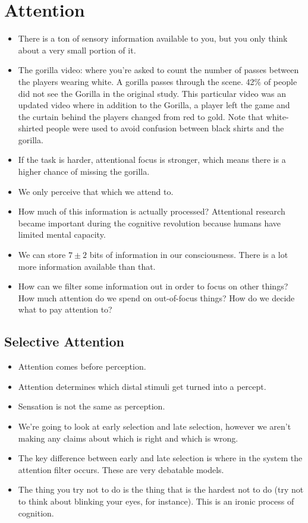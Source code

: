\documentclass[]{article}
\newcommand{\lecture}[1]{\marginpar{{\footnotesize $\leftarrow$ \underline{#1}}}}
\begin{document}
	\section{Attention} \lecture{January 29, 2013}
		\begin{itemize}
			\item There is a ton of sensory information available to you, but you only think about a very small portion of it.
			\item The gorilla video: where you're asked to count the number of passes between the players wearing white. A gorilla passes through the scene. 42\% of people did not see the Gorilla in the original study. This particular video was an updated video where in addition to the Gorilla, a player left the game and the curtain behind the players changed from red to gold. Note that white-shirted people were used to avoid confusion between black shirts and the gorilla.
			\item If the task is harder, attentional focus is stronger, which means there is a higher chance of missing the gorilla.
			\item We only perceive that which we attend to.
			\item How much of this information is actually processed? Attentional research became important during the cognitive revolution because humans have limited mental capacity.
			\item We can store $7 \pm 2$ bits of information in our consciousness. There is a lot more information available than that.
			\item How can we filter some information out in order to focus on other things? How much attention do we spend on out-of-focus things? How do we decide what to pay attention to?
		\end{itemize}

		\subsection{Selective Attention}
			\begin{itemize}
				\item Attention comes before perception.
				\item Attention determines which distal stimuli get turned into a percept.
				\item Sensation is not the same as perception.
				\item We're going to look at early selection and late selection, however we aren't making any claims about which is right and which is wrong.
				\item The key difference between early and late selection is where in the system the attention filter occurs. These are very debatable models.
				\item The thing you try not to do is the thing that is the hardest not to do (try not to think about blinking your eyes, for instance). This is an ironic process of cognition.
			\end{itemize}
\end{document}
